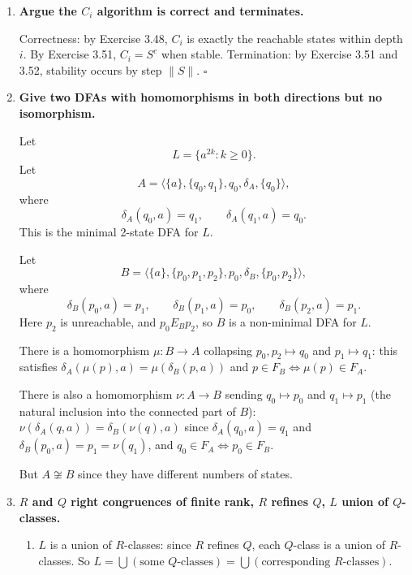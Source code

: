 \begin{enumerate}[{3.}1.]
Each strict inclusion $C_i\subsetneq C_{i+1}$ adds at least one new state. Starting from $\|C_0\|=1$, after at most $\|S\|-1$ strict inclusions we reach $C_{\|S\|-1}\supseteq\cdots$, which must equal $C_{\|S\|}$ (no room to grow beyond $\|S\|$ states). So $i\leq\|S\|-1\leq\|S\|$ and $C_i=S^c$. $\square$

\item \textbf{Argue the $C_i$ algorithm is correct and terminates.}

Correctness: by Exercise 3.48, $C_i$ is exactly the reachable states within depth $i$. By Exercise 3.51, $C_i=S^c$ when stable. Termination: by Exercise 3.51 and 3.52, stability occurs by step $\|S\|$. $\square$

\item \textbf{Give two DFAs with homomorphisms in both directions but no isomorphism.}

Let
\[
L = \{a^{2k} : k\geq 0\}.
\]
Let
\[
A=\langle\{a\},\{q_0,q_1\},q_0,\delta_A,\{q_0\}\rangle,
\]
where
\[
\delta_A(q_0,a)=q_1,\qquad \delta_A(q_1,a)=q_0.
\]
This is the minimal 2-state DFA for $L$.

Let
\[
B=\langle\{a\},\{p_0,p_1,p_2\},p_0,\delta_B,\{p_0,p_2\}\rangle,
\]
where
\[
\delta_B(p_0,a)=p_1,\qquad \delta_B(p_1,a)=p_0,\qquad \delta_B(p_2,a)=p_1.
\]
Here $p_2$ is unreachable, and $p_0 E_B p_2$, so $B$ is a non-minimal DFA for
$L$.

There is a homomorphism $\mu: B\to A$ collapsing $p_0,p_2\mapsto q_0$ and $p_1\mapsto q_1$: this satisfies $\delta_A(\mu(p),a)=\mu(\delta_B(p,a))$ and $p\in F_B\Leftrightarrow\mu(p)\in F_A$.

There is also a homomorphism $\nu: A\to B$ sending $q_0\mapsto p_0$ and $q_1\mapsto p_1$ (the natural inclusion into the connected part of $B$): $\nu(\delta_A(q,a))=\delta_B(\nu(q),a)$ since $\delta_A(q_0,a)=q_1$ and $\delta_B(p_0,a)=p_1=\nu(q_1)$, and $q_0\in F_A\Leftrightarrow p_0\in F_B$.

But $A\not\cong B$ since they have different numbers of states.

\item \textbf{$R$ and $Q$ right congruences of finite rank, $R$ refines $Q$, $L$ union of $Q$-classes.}

\begin{enumerate}
\item $L$ is a union of $R$-classes: since $R$ refines $Q$, each $Q$-class is a union of $R$-classes. So $L=\bigcup(\text{some }Q\text{-classes})=\bigcup(\text{corresponding }R\text{-classes})$.


\end{enumerate}
\end{enumerate}
